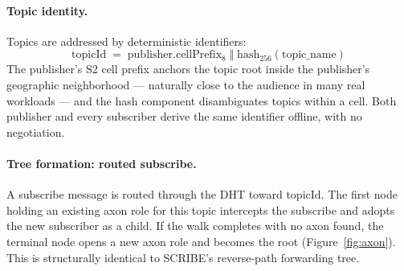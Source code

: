 \documentclass[conference]{IEEEtran}
\begin{document}
\paragraph{Topic identity.}
Topics are addressed by deterministic identifiers:
\[
\mathrm{topicId} \;=\; \mathrm{publisher}.\mathrm{cellPrefix}_{8}
\;\Vert\; \mathrm{hash}_{256}(\mathrm{topic\_name})
\]
The publisher's S2 cell prefix anchors the topic root inside the
publisher's geographic neighborhood --- naturally close to the
audience in many real workloads --- and the hash component
disambiguates topics within a cell.  Both publisher and every
subscriber derive the same identifier offline, with no
negotiation.

\paragraph{Tree formation: routed subscribe.}
A subscribe message is routed through the DHT toward
$\mathrm{topicId}$.  The first node holding an existing axon role
for this topic intercepts the subscribe and adopts the new
subscriber as a child.  If the walk completes with no axon
found, the terminal node opens a new axon role and becomes the
root (Figure~\ref{fig:axon}).  This is structurally identical to
SCRIBE's reverse-path forwarding tree.
\end{document}

